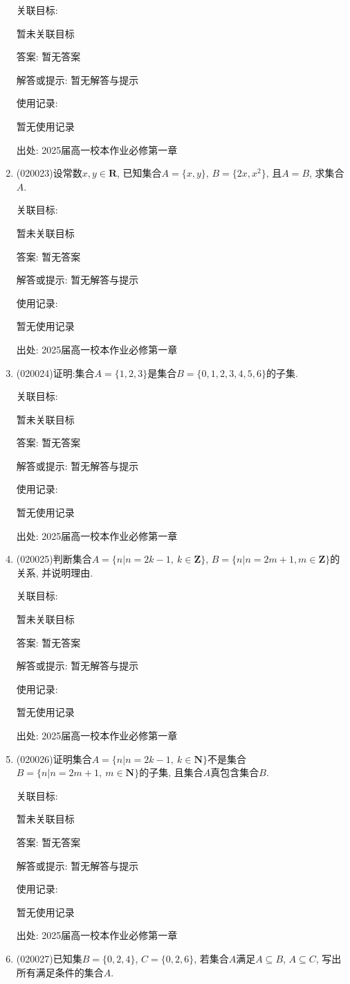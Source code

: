 \documentclass[10pt,a4paper]{article}
\begin{document}
\begin{enumerate}[1.]
关联目标:

暂未关联目标

答案: 暂无答案

解答或提示: 暂无解答与提示

使用记录:

暂无使用记录


出处: 2025届高一校本作业必修第一章
\item { (020023)}设常数$x,y\in \mathbf{R}$, 已知集合$A=\{x, y\}$, $B=\{2x, x^2\}$, 且$A=B$, 求集合$A$.


关联目标:

暂未关联目标

答案: 暂无答案

解答或提示: 暂无解答与提示

使用记录:

暂无使用记录


出处: 2025届高一校本作业必修第一章
\item { (020024)}证明:集合$A=\{1,2,3\}$是集合$B=\{0,1,2,3,4,5,6\}$的子集.


关联目标:

暂未关联目标

答案: 暂无答案

解答或提示: 暂无解答与提示

使用记录:

暂无使用记录


出处: 2025届高一校本作业必修第一章
\item { (020025)}判断集合$A=\{n|n=2k-1,\ k\in \mathbf{Z}\}$, $B=\{n|n=2m+1,m\in \mathbf{Z}\}$的关系, 并说明理由.


关联目标:

暂未关联目标

答案: 暂无答案

解答或提示: 暂无解答与提示

使用记录:

暂无使用记录


出处: 2025届高一校本作业必修第一章
\item { (020026)}证明集合$A=\{n|n=2k-1,\ k\in \mathbf{N}\}$不是集合$B=\{n|n=2m+1, \ m\in \mathbf{N}\}$的子集, 且集合$A$真包含集合$B$.


关联目标:

暂未关联目标

答案: 暂无答案

解答或提示: 暂无解答与提示

使用记录:

暂无使用记录


出处: 2025届高一校本作业必修第一章
\item { (020027)}已知集$B=\{0, 2, 4\}$, $C=\{0, 2, 6\}$, 若集合$A$满足$A\subseteq B$, $A\subseteq C$, 写出所有满足条件的集合$A$.



\end{enumerate}
\end{document}

